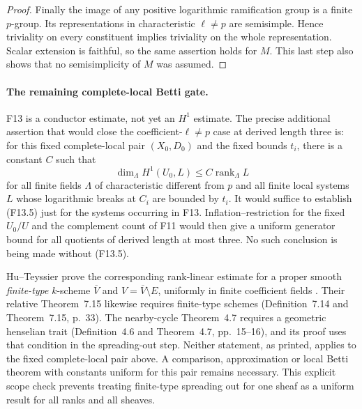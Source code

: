 \begin{proof}
Finally the image of any positive logarithmic ramification group
is a finite $p$-group. Its representations in characteristic
$\ell\ne p$ are semisimple. Hence triviality on every constituent
implies triviality on the whole representation. Scalar extension
is faithful, so the same assertion holds for $M$. This last step
also shows that no semisimplicity of $M$ was assumed.
\end{proof}

\paragraph{The remaining complete-local Betti gate.}
F13 is a conductor estimate, not yet an $H^1$ estimate. The precise
additional assertion that would close the coefficient-$\ell\ne p$
case at derived length three is: for this fixed complete-local
pair $(X_0,D_0)$ and the fixed bounds $t_i$, there is a constant
$C$ such that
\[
 \dim_\Lambda H^1(U_0,L)\leq C\operatorname{rank}_\Lambda L
 \tag{F13.5}
\]
for all finite fields $\Lambda$ of characteristic different from
$p$ and all finite local systems $L$ whose logarithmic breaks
at $C_i$ are bounded by $t_i$. It would suffice to establish
(F13.5) just for the systems occurring in F13.
Inflation--restriction for the fixed $U_0/U$ and the complement
count of F11 would then give a uniform generator bound for all
quotients of derived length at most three. No such conclusion is
being made without (F13.5).

Hu--Teyssier prove the corresponding rank-linear estimate for a
proper smooth \emph{finite-type} $k$-scheme $\overline V$ and
$V=\overline V\setminus E$, uniformly in finite coefficient fields
\cite[Theorem~7.34, p.~41]{HuTeyssier2025Betti}. Their relative
Theorem~7.15 likewise requires finite-type schemes
(Definition~7.14 and Theorem~7.15, p.~33). The nearby-cycle
Theorem~4.7 requires a geometric henselian trait
(Definition~4.6 and Theorem~4.7, pp.~15--16), and its proof uses
that condition in the spreading-out step. Neither statement,
as printed, applies to the fixed complete-local pair above.
A comparison, approximation or local Betti theorem with constants
uniform for this pair remains necessary. This explicit scope
check prevents treating finite-type spreading out for one sheaf
as a uniform result for all ranks and all sheaves.
